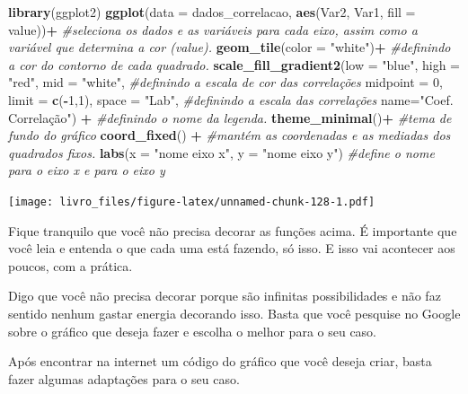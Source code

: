 \documentclass[
]{book}
\newenvironment{Shaded}{\begin{snugshade}}{\end{snugshade}}
\newcommand{\CommentTok}[1]{\textcolor[rgb]{0.56,0.35,0.01}{\textit{#1}}}
\newcommand{\DataTypeTok}[1]{\textcolor[rgb]{0.13,0.29,0.53}{#1}}
\newcommand{\DecValTok}[1]{\textcolor[rgb]{0.00,0.00,0.81}{#1}}
\newcommand{\KeywordTok}[1]{\textcolor[rgb]{0.13,0.29,0.53}{\textbf{#1}}}
\newcommand{\NormalTok}[1]{#1}
\newcommand{\OperatorTok}[1]{\textcolor[rgb]{0.81,0.36,0.00}{\textbf{#1}}}
\newcommand{\StringTok}[1]{\textcolor[rgb]{0.31,0.60,0.02}{#1}}
\begin{document}
\begin{Shaded}
\begin{Highlighting}[]
\KeywordTok{library}\NormalTok{(ggplot2)}
\KeywordTok{ggplot}\NormalTok{(}\DataTypeTok{data =}\NormalTok{ dados_correlacao, }\KeywordTok{aes}\NormalTok{(Var2, Var1, }\DataTypeTok{fill =}\NormalTok{ value))}\OperatorTok{+}\StringTok{ }\CommentTok{#seleciona os dados e as variáveis para cada eixo, assim como a variável que determina a cor (value).}
\StringTok{ }\KeywordTok{geom_tile}\NormalTok{(}\DataTypeTok{color =} \StringTok{"white"}\NormalTok{)}\OperatorTok{+}\StringTok{    }\CommentTok{#definindo a cor do contorno de cada quadrado.}
\StringTok{ }\KeywordTok{scale_fill_gradient2}\NormalTok{(}\DataTypeTok{low =} \StringTok{"blue"}\NormalTok{, }\DataTypeTok{high =} \StringTok{"red"}\NormalTok{, }\DataTypeTok{mid =} \StringTok{"white"}\NormalTok{, }\CommentTok{#definindo a escala de cor das correlações}
   \DataTypeTok{midpoint =} \DecValTok{0}\NormalTok{, }\DataTypeTok{limit =} \KeywordTok{c}\NormalTok{(}\OperatorTok{-}\DecValTok{1}\NormalTok{,}\DecValTok{1}\NormalTok{), }\DataTypeTok{space =} \StringTok{"Lab"}\NormalTok{, }\CommentTok{#definindo a escala das correlações}
   \DataTypeTok{name=}\StringTok{"Coef. Correlação"}\NormalTok{) }\OperatorTok{+}\StringTok{ }\CommentTok{#definindo o nome da legenda.}
\StringTok{  }\KeywordTok{theme_minimal}\NormalTok{()}\OperatorTok{+}\StringTok{ }\CommentTok{#tema de fundo do gráfico}
\StringTok{   }\KeywordTok{coord_fixed}\NormalTok{() }\OperatorTok{+}\StringTok{ }\CommentTok{#mantém as coordenadas e as mediadas dos quadrados fixos.}
\StringTok{  }\KeywordTok{labs}\NormalTok{(}\DataTypeTok{x =} \StringTok{"nome eixo x"}\NormalTok{, }\DataTypeTok{y =} \StringTok{"nome eixo y"}\NormalTok{) }\CommentTok{#define o nome para o eixo x e para o eixo y}
\end{Highlighting}
\end{Shaded}

\texttt{[image: livro\_files/figure-latex/unnamed-chunk-128-1.pdf]}

Fique tranquilo que você não precisa decorar as funções acima. É
importante que você leia e entenda o que cada uma está fazendo, só isso.
E isso vai acontecer aos poucos, com a prática.

Digo que você não precisa decorar porque são infinitas possibilidades e
não faz sentido nenhum gastar energia decorando isso. Basta que você
pesquise no Google sobre o gráfico que deseja fazer e escolha o melhor
para o seu caso.

Após encontrar na internet um código do gráfico que você deseja criar,
basta fazer algumas adaptações para o seu caso.
\end{document}
